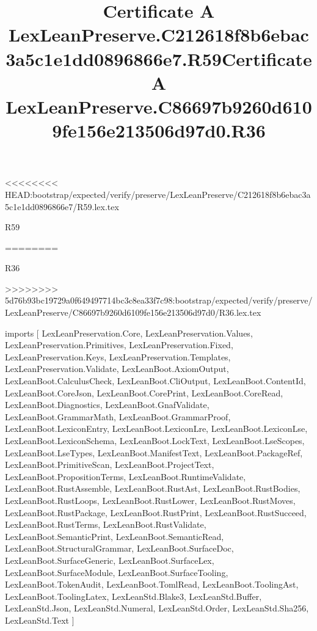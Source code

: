 <<<<<<<< HEAD:bootstrap/expected/verify/preserve/LexLeanPreserve/C212618f8b6ebac3a5c1e1dd0896866e7/R59.lex.tex
\begin{lexlean}{R59}
\title{Certificate A LexLeanPreserve.C212618f8b6ebac3a5c1e1dd0896866e7.R59}
========
\begin{lexlean}{R36}
\title{Certificate A LexLeanPreserve.C86697b9260d6109fe156e213506d97d0.R36}
>>>>>>>> 5d76b93bc19729a0f649497714bc3c8ea33f7c98:bootstrap/expected/verify/preserve/LexLeanPreserve/C86697b9260d6109fe156e213506d97d0/R36.lex.tex
\begin{coremodule}
imports [
  LexLeanPreservation.Core,
  LexLeanPreservation.Values,
  LexLeanPreservation.Primitives,
  LexLeanPreservation.Fixed,
  LexLeanPreservation.Keys,
  LexLeanPreservation.Templates,
  LexLeanPreservation.Validate,
  LexLeanBoot.AxiomOutput,
  LexLeanBoot.CalculusCheck,
  LexLeanBoot.CliOutput,
  LexLeanBoot.ContentId,
  LexLeanBoot.CoreJson,
  LexLeanBoot.CorePrint,
  LexLeanBoot.CoreRead,
  LexLeanBoot.Diagnostics,
  LexLeanBoot.GnafValidate,
  LexLeanBoot.GrammarMath,
  LexLeanBoot.GrammarProof,
  LexLeanBoot.LexiconEntry,
  LexLeanBoot.LexiconLre,
  LexLeanBoot.LexiconLse,
  LexLeanBoot.LexiconSchema,
  LexLeanBoot.LockText,
  LexLeanBoot.LseScopes,
  LexLeanBoot.LseTypes,
  LexLeanBoot.ManifestText,
  LexLeanBoot.PackageRef,
  LexLeanBoot.PrimitiveScan,
  LexLeanBoot.ProjectText,
  LexLeanBoot.PropositionTerms,
  LexLeanBoot.RuntimeValidate,
  LexLeanBoot.RustAssemble,
  LexLeanBoot.RustAst,
  LexLeanBoot.RustBodies,
  LexLeanBoot.RustLoops,
  LexLeanBoot.RustLower,
  LexLeanBoot.RustMoves,
  LexLeanBoot.RustPackage,
  LexLeanBoot.RustPrint,
  LexLeanBoot.RustSucceed,
  LexLeanBoot.RustTerms,
  LexLeanBoot.RustValidate,
  LexLeanBoot.SemanticPrint,
  LexLeanBoot.SemanticRead,
  LexLeanBoot.StructuralGrammar,
  LexLeanBoot.SurfaceDoc,
  LexLeanBoot.SurfaceGeneric,
  LexLeanBoot.SurfaceLex,
  LexLeanBoot.SurfaceModule,
  LexLeanBoot.SurfaceTooling,
  LexLeanBoot.TokenAudit,
  LexLeanBoot.TomlRead,
  LexLeanBoot.ToolingAst,
  LexLeanBoot.ToolingLatex,
  LexLeanStd.Blake3,
  LexLeanStd.Buffer,
  LexLeanStd.Json,
  LexLeanStd.Numeral,
  LexLeanStd.Order,
  LexLeanStd.Sha256,
  LexLeanStd.Text
]


\end{coremodule}
\end{lexlean}
\end{lexlean}
